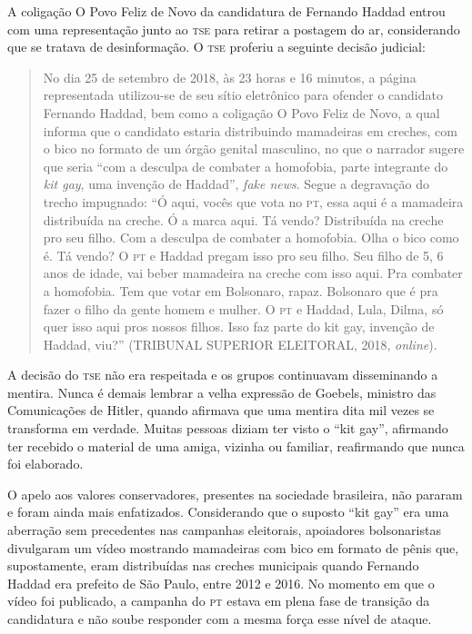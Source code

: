 A coligação O Povo Feliz de Novo da candidatura de Fernando Haddad
entrou com uma representação junto ao \textsc{tse}
para retirar a postagem do ar, considerando que se tratava de
desinformação. O \textsc{tse} proferiu a seguinte decisão judicial:

\begin{quote}
No dia 25 de setembro de 2018, às 23 horas e 16 minutos, a página representada
utilizou-se de seu sítio eletrônico para ofender o candidato Fernando
Haddad, bem como a coligação O Povo Feliz de Novo, a qual informa que o
candidato estaria distribuindo mamadeiras em creches, com o bico no
formato de um órgão genital masculino, no que o narrador sugere que
seria ``com a desculpa de combater a homofobia, parte integrante do \textit{kit
gay}, uma invenção de Haddad'', \textit{fake news}. Segue a degravação do trecho
impugnado: ``Ó aqui, vocês que vota no \textsc{pt}, essa aqui é a mamadeira
distribuída na creche. Ó a marca aqui. Tá vendo? Distribuída na creche
pro seu filho. Com a desculpa de combater a homofobia. Olha o bico como
é. Tá vendo? O \textsc{pt} e Haddad pregam isso pro seu filho. Seu filho de 5, 6
anos de idade, vai beber mamadeira na creche com isso aqui. Pra combater
a homofobia. Tem que votar em Bolsonaro, rapaz. Bolsonaro que é pra
fazer o filho da gente homem e mulher. O \textsc{pt} e Haddad, Lula, Dilma, só
quer isso aqui pros nossos filhos. Isso faz parte do kit gay, invenção
de Haddad, viu?'' (TRIBUNAL SUPERIOR ELEITORAL, 2018, \textit{online}).
\end{quote}

A decisão do \textsc{tse} não era respeitada e os grupos continuavam disseminando
a mentira. Nunca é demais lembrar a velha expressão de Goebels, ministro
das Comunicações de Hitler, quando afirmava que uma mentira dita mil
vezes se transforma em verdade. Muitas pessoas diziam ter visto o ``kit
gay'', afirmando ter recebido o material de uma amiga, vizinha ou
familiar, reafirmando que nunca foi elaborado.

O apelo aos valores conservadores, presentes na sociedade brasileira,
não pararam e foram ainda mais enfatizados. Considerando que o suposto
``kit gay'' era uma aberração sem precedentes nas campanhas eleitorais,
apoiadores bolsonaristas divulgaram um vídeo mostrando mamadeiras com
bico em formato de pênis que, supostamente, eram distribuídas nas
creches municipais quando Fernando Haddad era prefeito de São Paulo,
entre 2012 e 2016. No momento em que o vídeo foi publicado, a campanha
do \textsc{pt} estava em plena fase de transição da
candidatura e não soube responder com a mesma força esse nível de
ataque.

